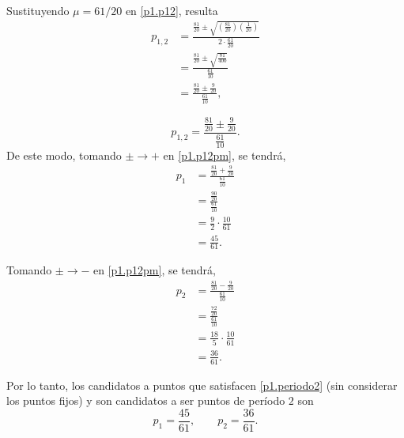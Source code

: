 \documentclass[12pt]{article}
\begin{document}
Sustituyendo $\mu=61/20$ en \eqref{p1.p12}, resulta
\begin{align*}
p_{1,2}
&=
\frac{\frac{81}{20}\pm
\sqrt{\left(\frac{81}{20}\right)\left(\frac{1}{20}\right)}}{2\cdot \frac{61}{20}}\\
&=
\frac{\frac{81}{20}\pm
\sqrt{\frac{81}{400}}}{\frac{61}{10}}\\
&=
\frac{\frac{81}{20}\pm\frac{9}{20}}{\frac{61}{10}},
\end{align*}

\begin{equation}\label{p1.p12pm}
    p_{1,2}=\frac{\frac{81}{20}\pm\frac{9}{20}}{\frac{61}{10}}.
\end{equation}
De este modo, tomando $\pm \to +$ en \eqref{p1.p12pm}, se tendrá,
\begin{align*}
p_1
&=
\frac{\frac{81}{20}+\frac{9}{20}}{\frac{61}{10}}\\
&=
\frac{\frac{90}{20}}{\frac{61}{10}}\\
&=
\frac{9}{2}\cdot\frac{10}{61}\\
&=
\frac{45}{61}.
\end{align*}

Tomando $\pm \to -$ en \eqref{p1.p12pm}, se tendrá,
\begin{align*}
p_2
&=
\frac{\frac{81}{20}-\frac{9}{20}}{\frac{61}{10}}\\
&=
\frac{\frac{72}{20}}{\frac{61}{10}}\\
&=
\frac{18}{5}\cdot\frac{10}{61}\\
&=
\frac{36}{61}.
\end{align*}

Por lo tanto, los candidatos a puntos que satisfacen \eqref{p1.periodo2} (sin considerar los puntos fijos) y son candidatos a ser puntos de período $2$ son
\begin{equation*}
p_1=\frac{45}{61},
\qquad
p_2=\frac{36}{61}.
\end{equation*}
\end{document}
